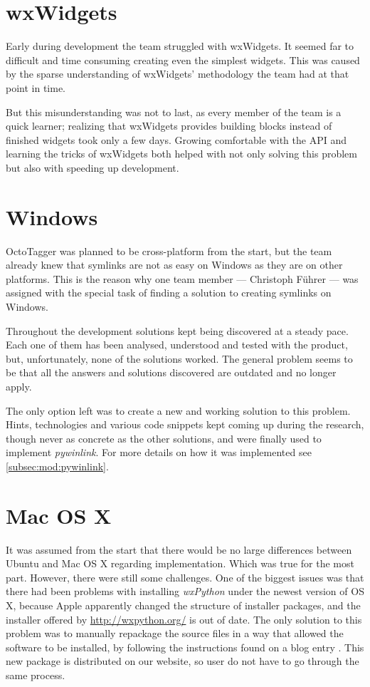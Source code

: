 \section{wxWidgets}

Early during development the team struggled with wxWidgets. It seemed far to
difficult and time consuming creating even the simplest widgets. This was
caused by the sparse understanding of wxWidgets' methodology the team had at
that point in time.

But this misunderstanding was not to last, as every member of the team is a
quick learner; realizing that wxWidgets provides building blocks instead of
finished widgets took only a few days. Growing comfortable with the API and
learning the tricks of wxWidgets both helped with not only solving this problem
but also with speeding up development.

\section{Windows}

OctoTagger was planned to be cross-platform from the start, but the team
already knew that symlinks are not as easy on Windows as they are on other
platforms. This is the reason why one team member --- Christoph Führer --- was
assigned with the special task of finding a solution to creating symlinks on
Windows.

Throughout the development solutions kept being discovered at a steady pace.
Each one of them has been analysed, understood and tested with the product,
but, unfortunately, none of the solutions worked. The general problem seems to
be that all the answers and solutions discovered are outdated and no longer
apply.

The only option left was to create a new and working solution to this problem.
Hints, technologies and various code snippets kept coming up during the
research, though never as concrete as the other solutions, and were finally
used to implement \emph{pywinlink}. For more details on how it was implemented
see \cref{subsec:mod:pywinlink}.

\section{Mac OS X}

It was assumed from the start that there would be no large differences between
Ubuntu and Mac OS X regarding implementation. Which was true for the most part.
However, there were still some challenges. One of the biggest issues was
that there had been problems with installing \emph{wxPython}  under the newest 
version of OS X, because Apple apparently changed the structure of installer packages,
and the installer offered by \url{http://wxpython.org/} is out of date. The only solution to this problem was to manually repackage the source files in a way that allowed the software to be installed, by following the instructions found on a blog entry \cite{blogentry}. This new package is distributed on our website, so user do not have to go through the same process.

